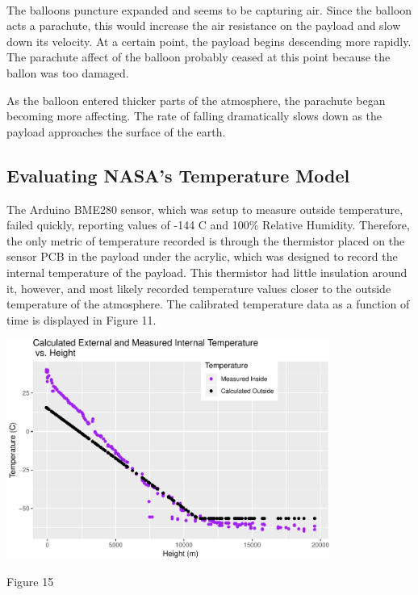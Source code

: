 \documentclass[12pt,]{article}
\begin{document}
~

The balloons puncture expanded and seems to be capturing air. Since the
balloon acts a parachute, this would increase the air resistance on the
payload and slow down its velocity. At a certain point, the payload
begins descending more rapidly. The parachute affect of the balloon
probably ceased at this point because the ballon was too damaged.

As the balloon entered thicker parts of the atmosphere, the parachute
began becoming more affecting. The rate of falling dramatically slows
down as the payload approaches the surface of the earth.

\subsection{Evaluating NASA's Temperature
Model}\label{evaluating-nasas-temperature-model}

The Arduino BME280 sensor, which was setup to measure outside
temperature, failed quickly, reporting values of -144 \degree C and
100\% Relative Humidity. Therefore, the only metric of temperature
recorded is through the thermistor placed on the sensor PCB in the
payload under the acrylic, which was designed to record the internal
temperature of the payload. This thermistor had little insulation around
it, however, and most likely recorded temperature values closer to the
outside temperature of the atmosphere. The calibrated temperature data
as a function of time is displayed in Figure 11.

\begin{center}\includegraphics[width=400px]{paper_files/figure-latex/temp_altitude-1} \end{center}

Figure 15

~
\end{document}
